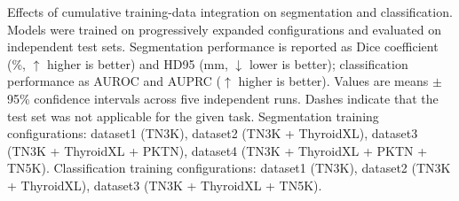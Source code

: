\begin{table}[p]
\centering

\caption{Effects of cumulative training-data integration on segmentation and classification. Models were trained on progressively expanded configurations and evaluated on independent test sets. Segmentation performance is reported as Dice coefficient (\%, $\uparrow$ higher is better) and HD95 (mm, $\downarrow$ lower is better); classification performance as AUROC and AUPRC ($\uparrow$ higher is better). Values are means $\pm$ 95\% confidence intervals across five independent runs. Dashes indicate that the test set was not applicable for the given task. Segmentation training configurations: dataset1 (TN3K), dataset2 (TN3K + ThyroidXL), dataset3 (TN3K + ThyroidXL + PKTN), dataset4 (TN3K + ThyroidXL + PKTN + TN5K). Classification training configurations: dataset1 (TN3K), dataset2 (TN3K + ThyroidXL), dataset3 (TN3K + ThyroidXL + TN5K).}
\label{tab:stacked_performance}

\footnotesize
\setlength{\tabcolsep}{5pt}
\renewcommand{\arraystretch}{1.08}


\end{table}
